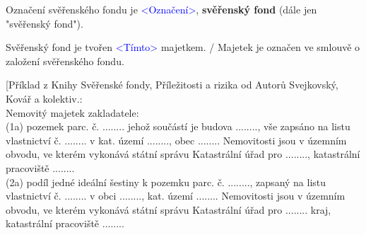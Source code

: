 \documentclass[parskip=half]{scrreprt}
\begin{document}
\begin{contract}


Označení svěřenského fondu je \textcolor{blue}{<Označení>}, \textbf{svěřenský fond} (dále jen "svěřenský fond").


Svěřenský fond je tvořen \textcolor{blue}{<Tímto>} majetkem. / Majetek je označen ve smlouvě o založení svěřenského fondu.

\parnumberfalse
[Příklad z Knihy Svěřenské fondy, Příležitosti a rizika od Autorů Svejkovský, Kovář a kolektiv.: \\

Nemovitý majetek zakladatele: \\
(1a) pozemek parc. č. ........ jehož součástí je budova ........, vše zapsáno na listu vlastnictví č. ........ v kat. území ........, obec ........ Nemovitosti jsou v územním obvodu, ve kterém vykonává státní správu Katastrální úřad pro ........, katastrální pracoviště ........\\
(2a) podíl jedné ideální šestiny k pozemku parc. č. ........, zapsaný na listu vlastnictví č. ........ v obci ........, kat. území ........ Nemovitosti jsou v územním obvodu, ve kterém vykonává státní správu Katastrální úřad pro ........ kraj, katastrální pracoviště ........\\

\end{contract}
\end{document}
